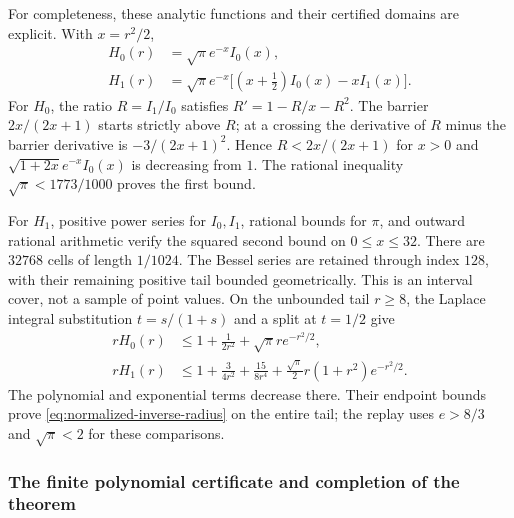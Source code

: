 For completeness, these analytic functions and their certified domains are
explicit.  With $x=r^2/2$,
\begin{align*}
 H_0(r)&=\sqrt\pi e^{-x}I_0(x),\\
 H_1(r)&=\sqrt\pi e^{-x}
       \bigl[(x+\tfrac12)I_0(x)-xI_1(x)\bigr].
\end{align*}
For $H_0$, the ratio $R=I_1/I_0$ satisfies
$R'=1-R/x-R^2$.  The barrier $2x/(2x+1)$ starts strictly above $R$;
at a crossing the derivative of $R$ minus the barrier derivative is
$-3/(2x+1)^2$.  Hence $R<2x/(2x+1)$ for $x>0$ and
$\sqrt{1+2x}e^{-x}I_0(x)$ is decreasing from $1$.
The rational inequality $\sqrt\pi<1773/1000$ proves the first bound.

For $H_1$, positive power series for $I_0,I_1$, rational bounds for $\pi$,
and outward rational arithmetic verify the squared second bound on
$0\le x\le32$.  There are $32768$ cells of length $1/1024$.
The Bessel series are retained through index $128$, with their remaining
positive tail bounded geometrically.  This is an interval cover, not a
sample of point values.  On the unbounded tail $r\ge8$, the Laplace
integral substitution $t=s/(1+s)$ and a split at $t=1/2$ give
\begin{align}
 rH_0(r)&\le 1+\frac{1}{2r^2}
                       +\sqrt\pi r e^{-r^2/2},\\
 rH_1(r)&\le 1+\frac{3}{4r^2}+\frac{15}{8r^4}
             +\frac{\sqrt\pi}{2}r(1+r^2)e^{-r^2/2}.
 \label{eq:inverse-tails}
\end{align}
The polynomial and exponential terms decrease there.  Their endpoint
bounds prove \eqref{eq:normalized-inverse-radius} on the entire tail;
the replay uses $e>8/3$ and $\sqrt\pi<2$ for these comparisons.

\subsubsection{The finite polynomial certificate and completion of the theorem}

